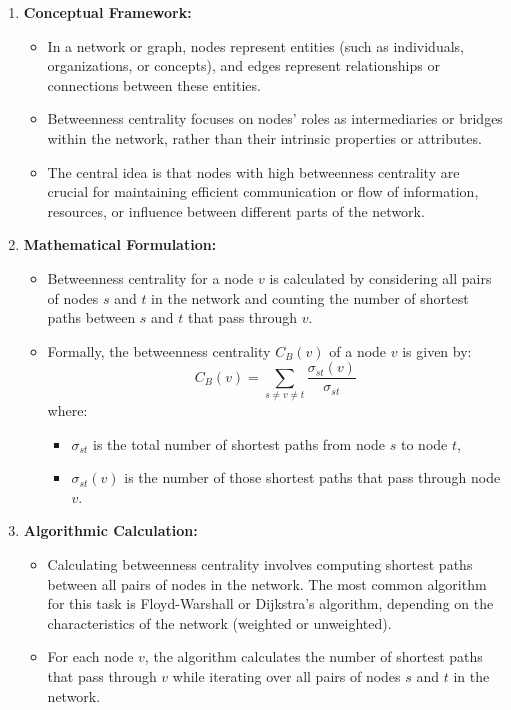 \documentclass{article}
\begin{document}
\begin{enumerate}
    \item \textbf{Conceptual Framework:}
    \begin{itemize}
        \item In a network or graph, nodes represent entities (such as individuals, organizations, or concepts), and edges represent relationships or connections between these entities.
        \item Betweenness centrality focuses on nodes' roles as intermediaries or bridges within the network, rather than their intrinsic properties or attributes.
        \item The central idea is that nodes with high betweenness centrality are crucial for maintaining efficient communication or flow of information, resources, or influence between different parts of the network.
    \end{itemize}
    
    \item \textbf{Mathematical Formulation:}
    \begin{itemize}
        \item Betweenness centrality for a node $v$ is calculated by considering all pairs of nodes $s$ and $t$ in the network and counting the number of shortest paths between $s$ and $t$ that pass through $v$.
        \item Formally, the betweenness centrality $C_B(v)$ of a node $v$ is given by:
        \[ C_B(v) = \sum_{s \neq v \neq t} \frac{\sigma_{st}(v)}{\sigma_{st}} \]
        where:
        \begin{itemize}
            \item $\sigma_{st}$ is the total number of shortest paths from node $s$ to node $t$,
            \item $\sigma_{st}(v)$ is the number of those shortest paths that pass through node $v$.
        \end{itemize}
    \end{itemize}
    
    \item \textbf{Algorithmic Calculation:}
    \begin{itemize}
        \item Calculating betweenness centrality involves computing shortest paths between all pairs of nodes in the network. The most common algorithm for this task is Floyd-Warshall or Dijkstra's algorithm, depending on the characteristics of the network (weighted or unweighted).
        \item For each node $v$, the algorithm calculates the number of shortest paths that pass through $v$ while iterating over all pairs of nodes $s$ and $t$ in the network.
    \end{itemize}
    

\end{enumerate}
\end{document}
